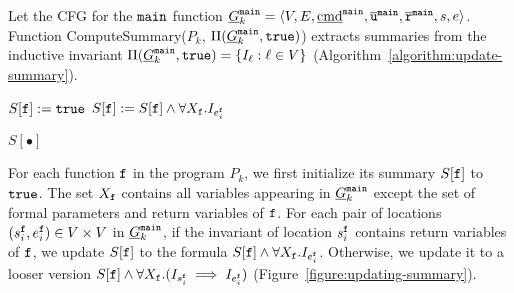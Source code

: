 Let the CFG for the $\mathtt{{main}}$ function $\underline{G}^{\mathtt{{main}}}_k = \langle V, E, \underline{\textmd{cmd}}^{\mathtt{{main}}}, \overline{\mathtt{u}}^{\mathtt{{main}}}, \overline{\mathtt{r}}^{\mathtt{{main}}},s,e \rangle$.
Function 
ComputeSummary($P_k$, $\Pi (\underline{G}^{\mathtt{{main}}}_k, \mathtt{true})$)
extracts summaries from the inductive invariant $\Pi (\underline{G}^{\mathtt{{main}}}_k, \mathtt{true})= \{ I_\ell : \ell \in V
\}$ (Algorithm~\ref{algorithm:update-summary}). 

\begin{algorithm}

  {	
  	$S[\mathtt{{f}}]:=\mathtt{true}$\;
   	{
       	{
         		$S[\mathtt{{f}}]:=S[\mathtt{{f}}]\wedge \forall X_\mathtt{f}. I_{e_i^{\mathtt{{f}}}}$       	}
       	}
    
  }
 
  \Return $S[\bullet]$\;
  \caption{
  $\textmd{ComputeSummary}(P_k, \Pi (\underline{G}^{\fun{main}}_k, \TT))$}
  \label{algorithm:update-summary}
\end{algorithm}

For each function $\mathtt{{f}}$ in the program $P_k$, we first initialize its summary $S[\mathtt{{f}}]$ to $\mathtt{true}$.
The set $X_{\mathtt{{f}}}$ contains all variables appearing in $\underline{G}^{\mathtt{{main}}}_k$ except the set of formal parameters and return variables of $\mathtt{{f}}$.
For each pair of locations $(s_i^{\mathtt{{f}}},e_i^{\mathtt{{f}}})\in V\times V$ in $\underline{G}^{\mathtt{{main}}}_k$, if the invariant of location $s_i^{\mathtt{{f}}}$ contains return variables of $\mathtt{{f}}$, we update $S[\mathtt{{f}}]$ to the formula $S[\mathtt{{f}}]\wedge \forall X_{\mathtt{{f}}}.I_{e_i^{\mathtt{{f}}}}$. Otherwise, we update it to a looser version $S[\mathtt{{f}}]\wedge \forall X_{\mathtt{{f}}}. (I_{s_i^{\mathtt{{f}}}} \implies I_{e_i^{\mathtt{{f}}}})$ (Figure~\ref{figure:updating-summary}).

